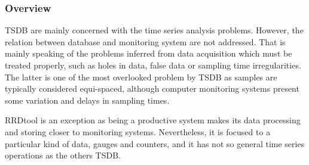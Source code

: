\subsubsection{Overview}

TSDB are mainly concerned with the time series analysis problems. However, the relation between database and monitoring system are not addressed. That is mainly speaking of the problems inferred from data acquisition which  must be treated properly, such as holes in data, false data or sampling time irregularities. 
The latter is one of the most overlooked problem by TSDB as samples are typically considered equi-spaced, although computer monitoring systems present some variation and delays in sampling times. 

RRDtool is an exception as being a productive system makes its data processing and storing closer to monitoring systems. Nevertheless, it is focused to a particular kind of data, gauges and counters, and it has not so general time series operations as the others TSDB.









